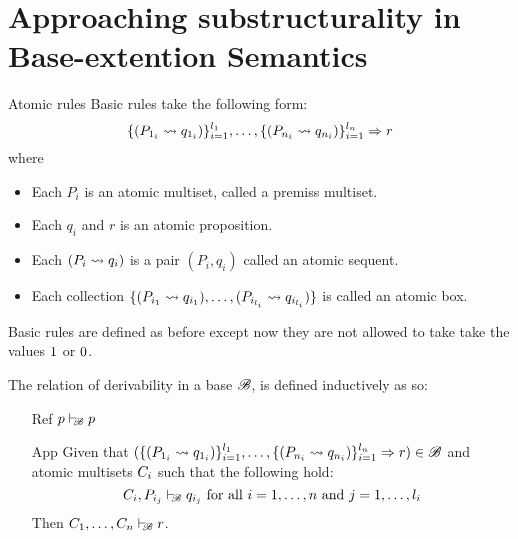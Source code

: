 \documentclass{beamer}
\begin{document}
\section{Approaching substructurality in Base-extention Semantics}
\begin{frame}
\begin{definition}{Atomic rules}
Basic rules take the following form: 
\[\openaddrule (\at{P}_{1_i} \seq \at{q}_{1_i})\closeaddrule^{l_1}_{i=1}, \dots, \openaddrule (\at{P}_{n_i} \seq \at{q}_{n_i})\closeaddrule^{l_n}_{i=1} \Rightarrow \at{r}\]
where 
\begin{itemize}
\item Each $P_i$ is an atomic multiset, called a premiss multiset.
\item Each $q_i$ and $r$ is an atomic proposition.
\item Each $(P_i \seq q_i)$ is a pair $(P_i, q_i)$ called an atomic sequent.
\item Each collection $\openaddrule (\at{P}_{i_1} \seq \at{q}_{i_1}), \dots, (\at{P}_{i_{l_i}} \seq \at{q}_{i_{l_i}})\closeaddrule$ is called an atomic box.
    \end{itemize}
\end{definition}
Basic rules are defined as before except now they are not allowed to take take the values $\mtop$ or $\abot$.
\end{frame}
\begin{frame}
\begin{definition}
The relation of derivability in a base $\baseB$, is defined inductively as so:
\begin{itemize}
\item[Ref] $p \deriveBaseM{\baseB} p$
\item[App] Given that $(\openaddrule(\at{P}_{1_i} \seq \at{q}_{1_{i}})\Closeaddrule{i=1}{l_1},\dots,\openaddrule(\at{P}_{n_i} \seq \at{q}_{n_{i}}) \Closeaddrule{i=1}{l_n} \Rightarrow \at{r}) \in \baseB$ and atomic multisets $\at{C}_i$ such that the following hold:
        \[\at{C}_i, \at{P}_{i_j} \deriveBaseM{\baseB} \at{q}_{i_j} \text{ for all } i = 1,\dots, n \text{ and } j = 1,\dots,l_i\]
Then $\at{C}_{1},\dots,\at{C}_{n}\deriveBaseM{\baseB} r$. 
\end{itemize}
\end{definition}
\end{frame}
\end{document}
